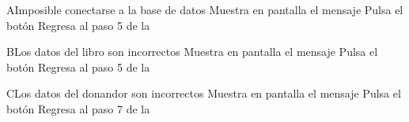 		\begin{UCtrayectoriaA}{A}{Imposible conectarse a la base de datos}
			\UCpaso Muestra en pantalla el mensaje 
			\UCpaso[\UCactor] Pulsa el botón 
			\UCpaso Regresa al paso 5 de la 
		\end{UCtrayectoriaA}
		
		\begin{UCtrayectoriaA}{B}{Los datos del libro son incorrectos}
			\UCpaso Muestra en pantalla el mensaje 
			\UCpaso[\UCactor] Pulsa el botón 
			\UCpaso Regresa al paso 5 de la 
		\end{UCtrayectoriaA}
		
		\begin{UCtrayectoriaA}{C}{Los datos del donandor son incorrectos}
			\UCpaso Muestra en pantalla el mensaje 
			\UCpaso [\UCactor] Pulsa el botón 
			\UCpaso Regresa al paso 7 de la 
		\end{UCtrayectoriaA}